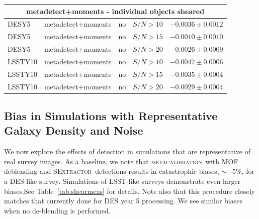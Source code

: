 \documentclass[fleqn,useAMS,usenatbib]{mnras}
\newcommand{\snr}{$S/N$}
\newcommand{\mcal}{\textsc{metacalibration}}
\newcommand{\sx}{\textsc{SExtractor}}
\begin{document}
\begin{table}
\begin{tabular}{|l|l|l|c|c|}
    \hline
    \multicolumn{5}{c}{metadetect+moments - individual objects sheared}\\
    \hline
    DESY5   & metadetect+moments & no & \snr$ > 10$ & $-0.0036 \pm 0.0012$  \\
    DESY5   & metadetect+moments & no & \snr$ > 15$ & $-0.0010 \pm 0.0010$  \\
    DESY5   & metadetect+moments & no & \snr$ > 20$ & $-0.0026 \pm 0.0009$  \\
    \hline
    LSSTY10  & metadetect+moments & no & \snr$ > 10$ & $-0.0047 \pm 0.0006$  \\
    LSSTY10  & metadetect+moments & no & \snr$ > 15$ & $-0.0035 \pm 0.0004$  \\
    LSSTY10  & metadetect+moments & no & \snr$ > 20$ & $-0.0029 \pm 0.0004$  \\
    \hline
  \end{tabular}

\end{table}

\subsection{Bias in Simulations with Representative Galaxy Density and Noise}

We now explore the effects of detection in simulations that are representative
of real survey images. As a baseline, we note that \mcal\ with MOF deblending
and \sx\ detections results in catastrophic biases, $\sim-5\%$, for a DES-like
survey. Simulations of LSST-like surveys demonstrate even larger biases.See
Table~\ref{tab:shearmeas} for details. Note also that this procedure closely
matches that currently done for DES year 5 processing.  We see similar biases
when no de-blending is performed.
\end{document}
